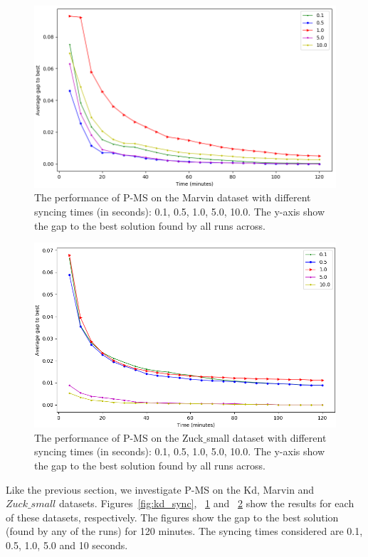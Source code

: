 \documentclass[authoryear,11pt,square,number,times,super,comma]{elsarticle}
\begin{document}
\begin{figure}[htbp]
  \includegraphics[width=14cm]{marvin_sync}
  \centering
  \caption{The performance of P-MS on the Marvin dataset with different syncing times (in seconds): 0.1, 0.5, 1.0, 5.0, 10.0. The y-axis show the gap to the best solution found by all runs across.}
  \label{fig:m_sync}
\end{figure}

\begin{figure}[htbp]
  \includegraphics[width=14cm]{zs_sync}
  \centering
  \caption{The performance of P-MS on the Zuck$\_$small dataset with different syncing times (in seconds): 0.1, 0.5, 1.0, 5.0, 10.0. The y-axis show the gap to the best solution found by all runs across.}
  \label{fig:zs_sync}
\end{figure}

Like the previous section, we investigate P-MS on the Kd, Marvin and $Zuck\_small$ datasets. Figures~\ref{fig:kd_sync}, ~\ref{fig:m_sync} and ~\ref{fig:zs_sync} show the results for each of these datasets, respectively. The figures show the gap to the best solution (found by any of the runs) for 120 minutes. The syncing times considered are 0.1, 0.5, 1.0, 5.0 and 10 seconds. 
\end{document}
